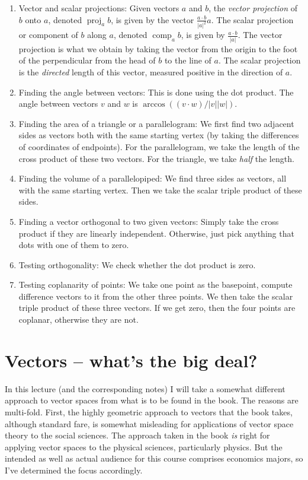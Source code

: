 \documentclass[10pt]{amsart}
\begin{document}
\begin{enumerate}
\item Vector and scalar projections: Given vectors $a$ and $b$, the
  {\em vector projection} of $b$ onto $a$, denoted
  $\operatorname{proj}_ab$, is given by the vector $\frac{a \cdot
  b}{|a|^2} a$. The scalar projection or component of $b$ along $a$,
  denoted $\operatorname{comp}_ab$, is given by $\frac{a \cdot
  b}{|a|}$. The vector projection is what we obtain by taking the
  vector from the origin to the foot of the perpendicular from the
  head of $b$ to the line of $a$. The scalar projection is the {\em
  directed} length of this vector, measured positive in the direction
  of $a$.
\item Finding the angle between vectors: This is done using the dot
  product. The angle between vectors $v$ and $w$ is $\arccos((v \cdot
  w)/|v||w|)$.
\item Finding the area of a triangle or a parallelogram: We first find
  two adjacent sides as vectors both with the same starting vertex (by
  taking the differences of coordinates of endpoints). For the
  parallelogram, we take the length of the cross product of these two
  vectors. For the triangle, we take {\em half} the length.
\item Finding the volume of a parallelopiped: We find three sides as
  vectors, all with the same starting vertex. Then we take the scalar
  triple product of these sides.
\item Finding a vector orthogonal to two given vectors: Simply take
  the cross product if they are linearly independent. Otherwise, just
  pick anything that dots with one of them to zero.
\item Testing orthogonality: We check whether the dot product is zero.
\item Testing coplanarity of points: We take one point as the
  basepoint, compute difference vectors to it from the other three
  points. We then take the scalar triple product of these three
  vectors. If we get zero, then the four points are coplanar,
  otherwise they are not.
\end{enumerate}

\section{Vectors -- what's the big deal?}

In this lecture (and the corresponding notes) I will take a somewhat
different approach to vector spaces from what is to be found in the
book. The reasons are multi-fold. First, the highly geometric approach
to vectors that the book takes, although standard fare, is somewhat
misleading for applications of vector space theory to the social
sciences. The approach taken in the book {\em is} right for applying
vector spaces to the physical sciences, particularly physics. But the
intended as well as actual audience for this course comprises
economics majors, so I've determined the focus accordingly.
\end{document}
